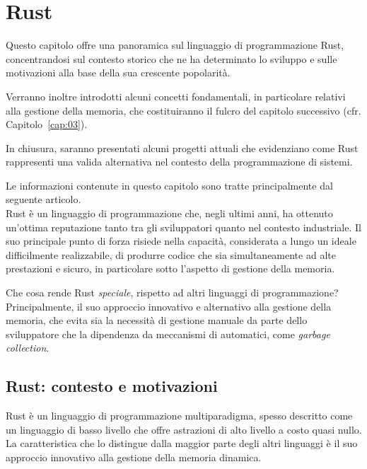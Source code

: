 
\chapter{Rust}\label{cap:02}

Questo capitolo offre una panoramica sul linguaggio di programmazione Rust, concentrandosi sul contesto storico che ne ha determinato lo sviluppo e sulle motivazioni alla base della sua crescente popolarità.

Verranno inoltre introdotti alcuni concetti fondamentali, in particolare relativi alla gestione della memoria, che costituiranno il fulcro del capitolo successivo (cfr. Capitolo~\ref{cap:03}).

In chiusura, saranno presentati alcuni progetti attuali che evidenziano come Rust rappresenti una valida alternativa nel contesto della programmazione di sistemi.

Le informazioni contenute in questo capitolo sono tratte principalmente dal seguente articolo\cite{rust-2023-interview}.
\vspace{15pt}\\
\noindent Rust è un linguaggio di programmazione che, negli ultimi anni, ha ottenuto un'ottima reputazione tanto tra gli sviluppatori quanto nel contesto industriale. Il suo principale punto di forza risiede nella capacità, considerata a lungo un ideale difficilmente realizzabile, di produrre codice che sia simultaneamente ad alte prestazioni e sicuro, in particolare sotto l'aspetto di gestione della memoria.

Che cosa rende Rust \textit{speciale}, rispetto ad altri linguaggi di programmazione? Principalmente, il suo approccio innovativo e alternativo alla gestione della memoria, che evita sia la necessità di gestione manuale da parte dello sviluppatore che la dipendenza da meccanismi di automatici, come \textit{garbage collection}.

\section{Rust: contesto e motivazioni}
Rust è un linguaggio di programmazione multiparadigma, spesso descritto come un linguaggio di basso livello che offre astrazioni di alto livello a costo quasi nullo.
La caratteristica che lo distingue dalla maggior parte degli altri linguaggi è il suo approccio innovativo alla gestione della memoria dinamica. 

